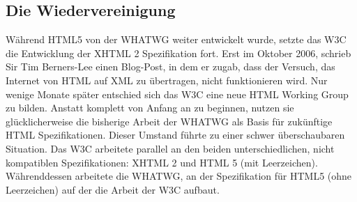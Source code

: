 \subsection{Die Wiedervereinigung}
Während HTML5 von der WHATWG weiter entwickelt wurde, setzte das W3C die
Entwicklung der XHTML 2 Spezifikation fort. Erst im Oktober 2006, schrieb Sir
Tim Berners-Lee einen Blog-Post, in dem er zugab, dass der Versuch, das
Internet von HTML auf XML zu übertragen, nicht funktionieren wird.
Nur wenige Monate später entschied sich das W3C eine neue HTML Working Group
zu bilden. Anstatt komplett von Anfang an zu beginnen, nutzen sie
glücklicherweise die bisherige Arbeit der WHATWG als Basis für zukünftige HTML
Spezifikationen. Dieser Umstand führte zu einer schwer überschaubaren
Situation. Das W3C arbeitete parallel an den beiden unterschiedlichen, nicht
kompatiblen Spezifikationen: XHTML 2 und HTML 5 (mit Leerzeichen).
Währenddessen arbeitete die WHATWG, an der Spezifikation für HTML5 (ohne
Leerzeichen) auf der die Arbeit der W3C aufbaut.

